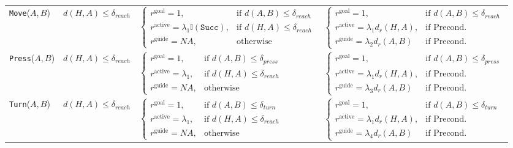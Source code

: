 \documentclass{article}
\begin{document}
\begin{table}[!htbp]
\begin{threeparttable}
\begin{tabular}{l l l l}
\addlinespace[4pt]

\texttt{Move}($A, B$) & 
$d(H, A) \le \delta_{reach}$ & 
$\begin{cases} 
r^{\text{goal}}=1, & \text{if } d(A, B) \le \delta_{reach} \\ 
r^{\text{active}}= \lambda_1 \mathbb{I}(\texttt{Succ}),  & \text{if } d(H, A) \le \delta_{reach} \\ 
r^{\text{guide}}= NA, & \text{otherwise} 
\end{cases}$ & 
$\begin{cases} 
r^{\text{goal}}=1, & \text{if } d(A, B) \le \delta_{reach} \\ 
r^{\text{active}}=\lambda_1 d_r(H, A),  & \text{if } \text{Precond.}  \\ 
r^{\text{guide}}=  {\lambda_2 d_r(A, B)}  & \text{if } \text{Precond.}  
\end{cases}$ \\

\addlinespace[4pt]

\texttt{Press}($A, B$) & 
$d(H, A) \le \delta_{reach}$ & 
$\begin{cases} 
r^{\text{goal}}=1, & \text{if } d(A, B) \le \delta_{press} \\ 
r^{\text{active}}= \lambda_1 ,  & \text{if } d(H, A) \le \delta_{reach} \\ 
r^{\text{guide}}= NA, & \text{otherwise} 
\end{cases}$ & 
$\begin{cases} 
r^{\text{goal}}=1, & \text{if } d(A, B) \le \delta_{press} \\ 
r^{\text{active}}=\lambda_1 d_r(H, A),  & \text{if } \text{Precond.}  \\ 
r^{\text{guide}}=  {\lambda_3 d_r(A, B)}  & \text{if } \text{Precond.} 
\end{cases}$ \\

\addlinespace[4pt]

\texttt{Turn}($A, B$) & 
$d(H, A) \le \delta_{reach}$ & 
$\begin{cases} 
r^{\text{goal}}=1, & \text{if } d(A, B) \le \delta_{turn} \\ 
r^{\text{active}}=\lambda_1  , & \text{if } d(H, A) \le \delta_{reach} \\ 
r^{\text{guide}}= NA, & \text{otherwise} 
\end{cases}$ & 
$\begin{cases} 
r^{\text{goal}}=1, & \text{if } d(A, B) \le \delta_{turn} \\ 
r^{\text{active}}=\lambda_1 d_r(H, A),  & \text{if } \text{Precond.} \\ 
r^{\text{guide}}=  {\lambda_4 d_r(A, B)}  & \text{if } \text{Precond.} 
\end{cases}$ \\



\end{tabular}
\end{threeparttable}
\end{table}
\end{document}
